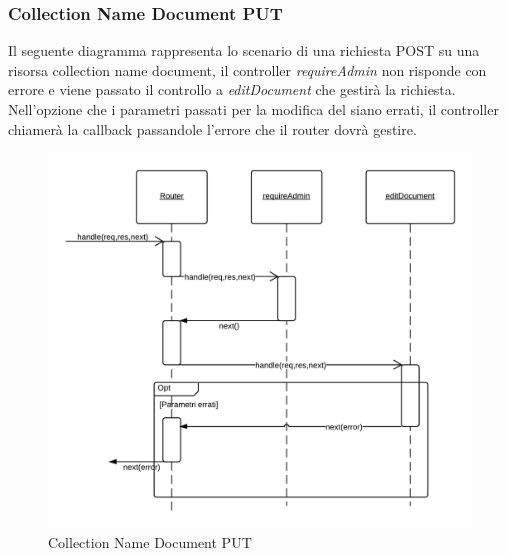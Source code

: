 \subsubsection{Collection Name Document PUT}
Il seguente diagramma rappresenta lo scenario di una richiesta POST su una risorsa collection name document, il controller \emph{requireAdmin} non risponde con errore e viene passato il controllo a \emph{editDocument} che gestirà la richiesta.
Nell'opzione che i parametri passati per la modifica del  siano errati, il controller chiamerà la callback passandole l'errore che il router dovrà gestire.
\begin{figure}[H]
	\begin{center} 
		\includegraphics[scale=0.20]{scenari/Collection Name Document PUT.png} 
		\caption{Collection Name Document PUT}
	\end{center} 
\end{figure}

